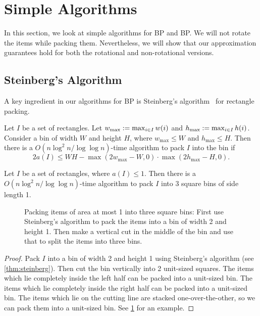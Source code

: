 \section{Simple Algorithms}
\label{sec:simple-algos}

In this section, we look at simple algorithms for  BP
and  BP.
We will not rotate the items while packing them.
Nevertheless, we will show that our approximation guarantees
hold for both the rotational and non-rotational versions.

\subsection{Steinberg's Algorithm}

A key ingredient in our algorithms for  BP is
Steinberg's algorithm~\cite{steinberg1997strip} for rectangle packing.

\begin{lemma}
\label{thm:steinberg}
Let $I$ be a set of rectangles. Let $w_{\max} := \max_{i \in I} w(i)$
and $h_{\max} := \max_{i \in I} h(i)$. Consider a bin of width $W$ and height $H$,
where $w_{\max} \le W$ and $h_{\max} \le H$.
Then there is a $O(n\log^2 n/\log\log n)$-time algorithm to pack $I$ into the bin if
\[ 2a(I) \le WH - \max(2w_{\max} - W, 0) \cdot \max(2h_{\max} - H, 0). \]
\end{lemma}

\begin{lemma}
\label{corr:steinberg}
Let $I$ be a set of rectangles, where $a(I) \le 1$.
Then there is a $O(n\log^2 n/\log\log n)$-time algorithm to pack $I$ into
3 square bins of side length 1.
\end{lemma}

\begin{figure}[htb]
\centering

\caption[Packing items of area at most 1 into three bins using Steinberg's algorithm.]%
{Packing items of area at most 1 into three square bins:
First use Steinberg's algorithm to pack the items into a bin of width 2 and height 1.
Then make a vertical cut in the middle of the bin
and use that to split the items into three bins.}
\label{fig:steinberg}
\end{figure}

\begin{proof}
Pack $I$ into a bin of width 2 and height 1 using Steinberg's algorithm
(see \cref{thm:steinberg}).
Then cut the bin vertically into 2 unit-sized squares.
The items which lie completely inside the left half can be packed into a unit-sized bin.
The items which lie completely inside the right half can be packed into a unit-sized bin.
The items which lie on the cutting line are stacked one-over-the-other,
so we can pack them into a unit-sized bin.
See \cref{fig:steinberg} for an example.
\end{proof}

